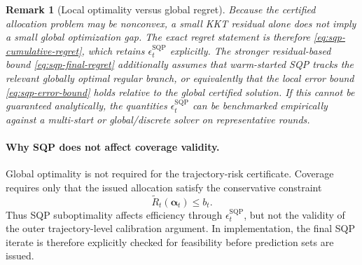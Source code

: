\documentclass[11pt]{article}
\newtheorem{remark}{Remark}
\begin{document}
\begin{remark}[Local optimality versus global regret]
\label{rem:sqp-globality}
Because the certified allocation problem may be nonconvex, a small KKT
residual alone does not imply a small global optimization gap.  The exact
regret statement is therefore
\eqref{eq:sqp-cumulative-regret}, which retains
$\epsilon_t^{\mathrm{SQP}}$ explicitly.  The stronger residual-based bound
\eqref{eq:sqp-final-regret} additionally assumes that warm-started SQP tracks
the relevant globally optimal regular branch, or equivalently that the local
error bound \eqref{eq:sqp-error-bound} holds relative to the global certified
solution.  If this cannot be guaranteed analytically, the quantities
$\epsilon_t^{\mathrm{SQP}}$ can be benchmarked empirically against a
multi-start or global/discrete solver on representative rounds.
\end{remark}

\paragraph{Why SQP does not affect coverage validity.}
Global optimality is not required for the trajectory-risk certificate.
Coverage requires only that the issued allocation satisfy the conservative
constraint
\[
    \widetilde R_t(\bm\alpha_t)
    \le
    b_t.
\]
Thus SQP suboptimality affects efficiency through
$\epsilon_t^{\mathrm{SQP}}$, but not the validity of the outer trajectory-level
calibration argument.  In implementation, the final SQP iterate is therefore
explicitly checked for feasibility before prediction sets are issued.
\end{document}
